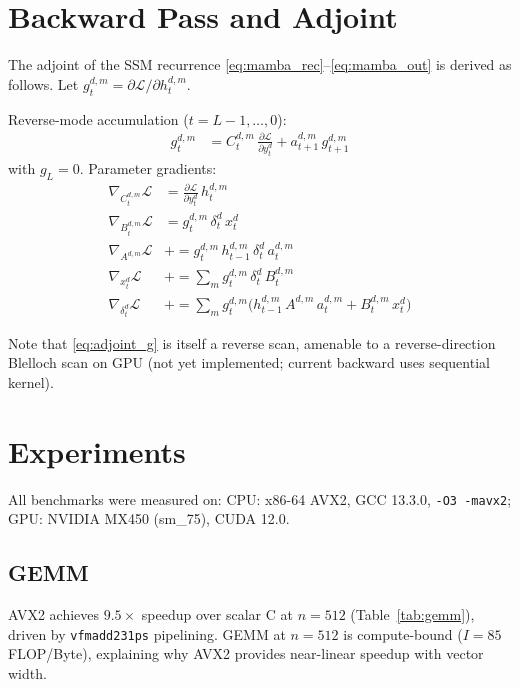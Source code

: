 \documentclass[10pt,twocolumn]{article}
\begin{document}
\section{Backward Pass and Adjoint}
\label{sec:backward}

The adjoint of the SSM recurrence \eqref{eq:mamba_rec}--\eqref{eq:mamba_out}
is derived as follows. Let $g_t^{d,m} = \partial \mathcal{L}/\partial h_t^{d,m}$.

Reverse-mode accumulation ($t = L{-}1, \ldots, 0$):
\begin{align}
  g_t^{d,m} &= C_t^{d,m}\,\frac{\partial\mathcal{L}}{\partial y_t^d}
             + a_{t+1}^{d,m}\,g_{t+1}^{d,m} \label{eq:adjoint_g}
\end{align}
with $g_L = 0$. Parameter gradients:
\begin{align}
  \nabla_{C_t^{d,m}}\mathcal{L} &= \frac{\partial\mathcal{L}}{\partial y_t^d}\,h_t^{d,m} \\
  \nabla_{B_t^{d,m}}\mathcal{L} &= g_t^{d,m}\,\delta_t^d\,x_t^d \\
  \nabla_{A^{d,m}}\mathcal{L}   &+= g_t^{d,m}\,h_{t-1}^{d,m}\,\delta_t^d\,a_t^{d,m} \\
  \nabla_{x_t^d}\mathcal{L}     &+= \sum_m g_t^{d,m}\,\delta_t^d\,B_t^{d,m} \\
  \nabla_{\delta_t^d}\mathcal{L} &+= \sum_m g_t^{d,m}
        \bigl(h_{t-1}^{d,m}\,A^{d,m}\,a_t^{d,m} + B_t^{d,m}\,x_t^d\bigr)
\end{align}

Note that \eqref{eq:adjoint_g} is itself a reverse scan, amenable to
a reverse-direction Blelloch scan on GPU (not yet implemented;
current backward uses sequential kernel).

\section{Experiments}
\label{sec:experiments}

All benchmarks were measured on:
CPU: x86-64 AVX2, GCC 13.3.0, \texttt{-O3 -mavx2};
GPU: NVIDIA MX450 (sm\_75), CUDA 12.0.

\subsection{GEMM}
AVX2 achieves $9.5\times$ speedup over scalar C at $n = 512$
(Table~\ref{tab:gemm}), driven by \texttt{vfmadd231ps} pipelining.
GEMM at $n = 512$ is compute-bound ($I = 85$ FLOP/Byte),
explaining why AVX2 provides near-linear speedup with vector width.
\end{document}
